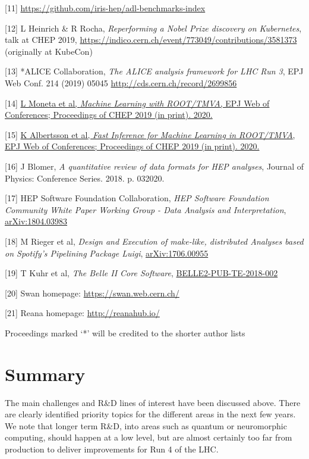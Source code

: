 \documentclass[10pt,a4paper]{article}
\begin{document}
{[}11{]}
\href{https://github.com/iris-hep/adl-benchmarks-index}{{https://github.com/iris-hep/adl-benchmarks-index}}

{[}12{]} L Heinrich \& R Rocha, \emph{Reperforming a Nobel Prize
discovery on Kubernetes}, talk at CHEP 2019,
\href{https://indico.cern.ch/event/773049/contributions/3581373}{{https://indico.cern.ch/event/773049/contributions/3581373}}
(originally at KubeCon)

{[}13{]} *ALICE Collaboration, \emph{The ALICE analysis framework for
LHC Run 3}, EPJ Web Conf. 214 (2019) 05045
\href{http://cds.cern.ch/record/2699856}{{http://cds.cern.ch/record/2699856}}

{[}14{]} \href{http://paperpile.com/b/2mqsuS/IDej}{L Moneta et al,
\emph{Machine Learning with ROOT/TMVA}, EPJ Web of Conferences;
Proceedings of CHEP 2019 (in print). 2020.}

{[}15{]} \href{http://paperpile.com/b/2mqsuS/6uIv}{K Albertsson et al,
\emph{Fast Inference for Machine Learning in ROOT/TMVA}, EPJ Web of
Conferences; Proceedings of CHEP 2019 (in print). 2020.}

{[}16{]} J Blomer, \emph{A quantitative review of data formats for HEP
analyses}, Journal of Physics: Conference Series. 2018. p. 032020.

{[}17{]} HEP Software Foundation Collaboration, \emph{HEP Software
Foundation Community White Paper Working Group - Data Analysis and
Interpretation},
\href{https://arxiv.org/abs/1804.03983}{{arXiv:1804.03983}}

{[}18{]} M Rieger et al, \emph{Design and Execution of make-like,
distributed Analyses based on Spotify's Pipelining Package Luigi},
\href{https://arxiv.org/abs/1706.00955}{{arXiv:1706.00955}}

{[}19{]} T Kuhr et al, \emph{The Belle II Core Software},
\href{https://docs.belle2.org/record/1044}{{BELLE2-PUB-TE-2018-002}}

{[}20{]} Swan homepage:
\href{https://swan.web.cern.ch/}{{https://swan.web.cern.ch/}}

{[}21{]} Reana homepage:
\href{http://reanahub.io/}{{http://reanahub.io/}}

Proceedings marked `*' will be credited to the shorter author lists

\hypertarget{summary}{%
\section{Summary}\label{summary}}

The main challenges and R\&D lines of interest have been discussed
above. There are clearly identified priority topics for the different
areas in the next few years. We note that longer term R\&D, into areas
such as quantum or neuromorphic computing, should happen at a low level,
but are almost certainly too far from production to deliver improvements
for Run 4 of the LHC.
\end{document}
